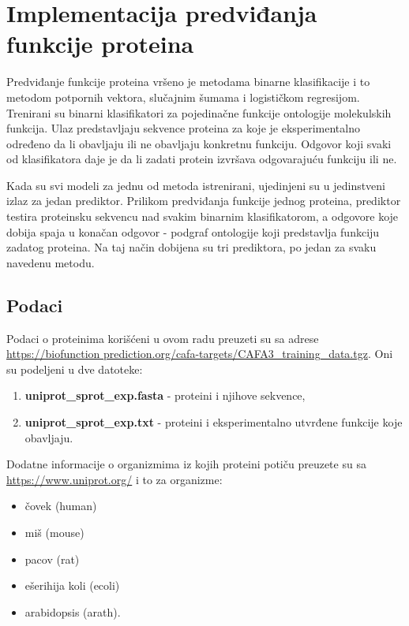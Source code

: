 \chapter{Implementacija predviđanja funkcije proteina}
\label{Chapter5}

Predviđanje funkcije proteina vršeno je metodama binarne klasifikacije i to metodom potpornih vektora, slučajnim šumama i logističkom regresijom. Trenirani su binarni klasifikatori za pojedinačne funkcije ontologije molekulskih funkcija. Ulaz predstavljaju sekvence proteina za koje je eksperimentalno određeno da li obavljaju ili ne obavljaju konkretnu funkciju. Odgovor koji svaki od klasifikatora daje je da li zadati protein izvršava odgovarajuću funkciju ili ne.

Kada su svi modeli za jednu od metoda istrenirani, ujedinjeni su u jedinstveni izlaz za jedan prediktor. Prilikom predviđanja funkcije jednog proteina, prediktor testira proteinsku sekvencu nad svakim binarnim klasifikatorom, a odgovore koje dobija spaja u konačan odgovor - podgraf ontologije koji predstavlja funkciju zadatog proteina. Na taj način dobijena su tri prediktora, po jedan za svaku navedenu metodu.



\section{Podaci}

Podaci o proteinima korišćeni u ovom radu preuzeti su sa adrese \href{https://biofunctionprediction.org/cafa-targets/CAFA3_training_data.tgz}{https://biofunction prediction.org/cafa-targets/CAFA3\_training\_data.tgz}. Oni su podeljeni u dve datoteke:

\begin{enumerate}
	\item \textbf{uniprot\_sprot\_exp.fasta} - proteini i njihove sekvence,
	\item \textbf{uniprot\_sprot\_exp.txt} - proteini i eksperimentalno utvrđene funkcije koje obavljaju.
\end{enumerate}

Dodatne informacije o organizmima iz kojih proteini potiču preuzete su sa \url{https://www.uniprot.org/} i to za organizme:
	\begin{itemize}
		\item čovek (human)
		\item miš (mouse)
		\item pacov (rat)
		\item ešerihija koli (ecoli)
		\item arabidopsis (arath).
	\end{itemize}


